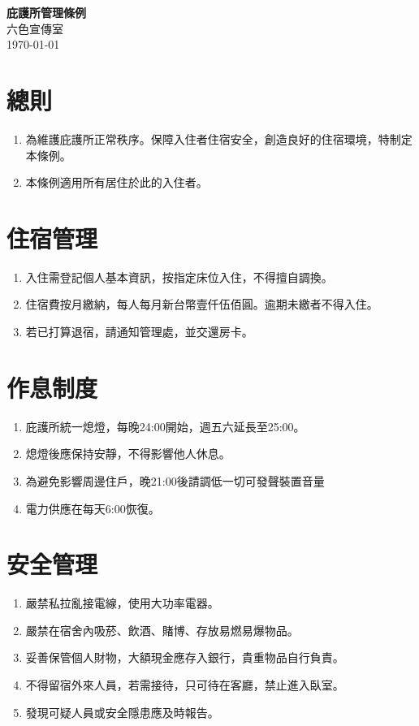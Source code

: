 \documentclass[12pt]{article}
\begin{document}
\allsectionsfont{\sffamily}
\begin{center}
	\huge\textsf{\textbf{庇護所管理條例}}\\
	\vspace{0.5cm}
	\normalsize 六色宣傳室\\
	\vspace{0.25cm}
	\today
\end{center}

\section{總則}
\begin{enumerate}
    \item 為維護庇護所正常秩序。保障入住者住宿安全，創造良好的住宿環境，特制定本條例。
    \item 本條例適用所有居住於此的入住者。
\end{enumerate}

\section{住宿管理}
\begin{enumerate}
	\item 入住需登記個人基本資訊，按指定床位入住，不得擅自調換。
	\item 住宿費按月繳納，每人每月新台幣壹仟伍佰圓。逾期未繳者不得入住。
	\item 若已打算退宿，請通知管理處，並交還房卡。
\end{enumerate}

\section{作息制度}
\begin{enumerate}
	\item 庇護所統一熄燈，每晚24:00開始，週五六延長至25:00。
	\item 熄燈後應保持安靜，不得影響他人休息。
	\item 為避免影響周邊住戶，晚21:00後請調低一切可發聲裝置音量
	\item 電力供應在每天6:00恢復。
\end{enumerate}

\section{安全管理}
\begin{enumerate}
	\item 嚴禁私拉亂接電線，使用大功率電器。
	\item 嚴禁在宿舍內吸菸、飲酒、賭博、存放易燃易爆物品。
	\item 妥善保管個人財物，大額現金應存入銀行，貴重物品自行負責。
	\item 不得留宿外來人員，若需接待，只可待在客廳，禁止進入臥室。
	\item 發現可疑人員或安全隱患應及時報告。
\end{enumerate}
\end{document}
